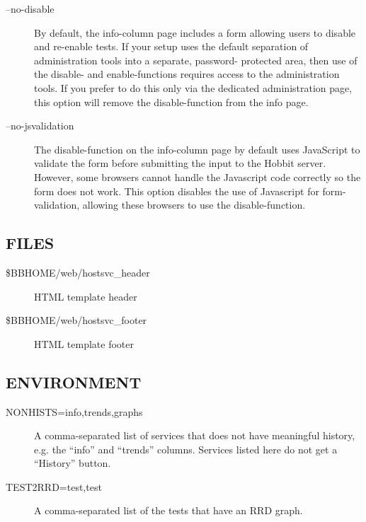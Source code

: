 \begin{description}
 

\item[--no-disable] By default, the info-column page includes a form allowing users to disable and re-enable tests. If your setup uses the default separation of administration tools into a separate, password- protected area, then use of the disable- and enable-functions requires access to the administration tools. If you prefer to do this only via the dedicated administration page, this option will remove the disable-function from the info page. 

 

\item[--no-jsvalidation] The disable-function on the info-column page by default uses JavaScript to validate the form before submitting the input to the Hobbit server. However, some browsers cannot handle the Javascript code correctly so the form does not work. This option disables the use of Javascript for form-validation, allowing these browsers to use the disable-function. 

 


\end{description}
\subsection{FILES}
\begin{description}
\item[\$BBHOME/web/hostsvc\_header] HTML template header 

 

\item[\$BBHOME/web/hostsvc\_footer] HTML template footer 

 


\end{description}
\subsection{ENVIRONMENT}
\begin{description}
\item[NONHISTS=info,trends,graphs] A comma-separated list of services that does not have meaningful history, e.g. the ``info'' and ``trends'' columns. Services listed here do not get a ``History'' button. 

 

\item[TEST2RRD=test,test] A comma-separated list of the tests that have an RRD graph. 

 


\end{description}
